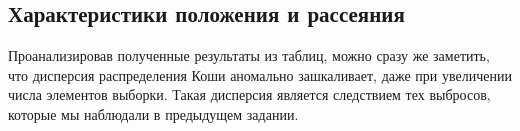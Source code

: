 \subsection{Характеристики положения и рассеяния}
Проанализировав полученные результаты из таблиц, можно сразу же заметить, что дисперсия распределения Коши аномально зашкаливает, даже при увеличении числа элементов выборки. Такая дисперсия является следствием тех выбросов, которые мы наблюдали в предыдущем задании.